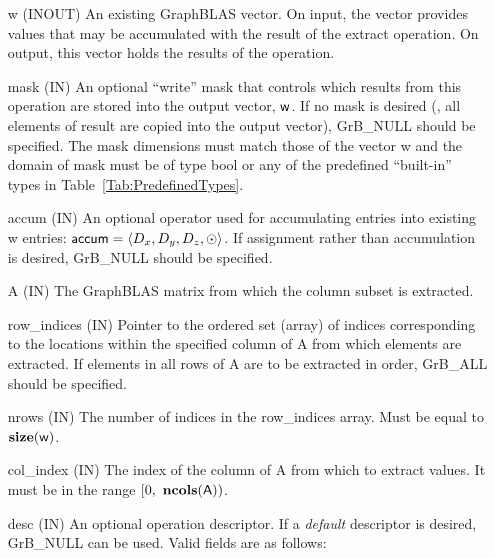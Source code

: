 \begin{itemize}[leftmargin=1in]
    \item[{\sf w}]    ({\sf INOUT}) An existing GraphBLAS vector.  On input,
    the vector provides values that may be accumulated with the result of the
    extract operation.  On output, this vector holds the results of the
    operation.

    \item[{\sf mask}]  ({\sf IN}) An optional ``write'' mask that controls which
    results from this operation are stored into the output vector,
    ${\sf w}$.  If no mask is desired (\ie, all elements
    of result are copied into the output vector), {\sf GrB\_NULL}
    should be specified. The mask dimensions must match those of the
    vector {\sf w} and the domain of {\sf mask} must be
    of type {\sf bool} or any of the predefined ``built-in'' types in
    Table~\ref{Tab:PredefinedTypes}.

    \item[{\sf accum}]    ({\sf IN}) An optional operator used for accumulating
    entries into existing {\sf w} entries: ${\sf accum} = \langle D_x,
    D_y, D_z,\odot \rangle$. If assignment rather than accumulation is
    desired, {\sf GrB\_NULL} should be specified.


    \item[{\sf A}]     ({\sf IN})  The GraphBLAS matrix from which the column
    subset is extracted.

    \item[{\sf row\_indices}] ({\sf IN}) Pointer to the ordered set (array) of 
    indices corresponding to the locations within the specified column of {\sf A} 
    from which elements are extracted.  If elements in all rows of {\sf A} are 
    to be extracted in order, {\sf GrB\_ALL} should be specified.
    
    \item[{\sf nrows}] ({\sf IN}) The number of indices in the {\sf row\_indices}
    array.  Must be equal to $\bold{size}({\sf w})$.
    
    \item[{\sf col\_index}]  ({\sf IN}) The index of the column of {\sf A} from
    which to extract values.  It must be in the range $[0,\ \bold{ncols}({\sf A}))$.

    \item[{\sf desc}]  ({\sf IN}) An optional operation descriptor.  If a 
    \emph{default} descriptor is desired, {\sf GrB\_NULL} can be used.  Valid 
    fields are as follows: \\
    

\end{itemize}
